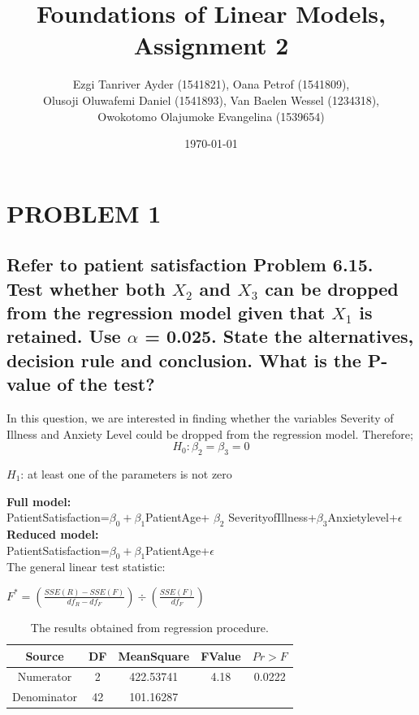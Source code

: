 \documentclass[a4paper,9pt]{article}\usepackage[]{graphicx}\usepackage[]{color}
\title{Foundations of Linear Models, Assignment 2}
\author{ Ezgi Tanriver Ayder (1541821), Oana Petrof (1541809), \\Olusoji Oluwafemi Daniel (1541893), Van Baelen Wessel (1234318), \\Owokotomo Olajumoke Evangelina (1539654)}
\date{\today}
\begin{document}
\maketitle
\section*{PROBLEM 1}
\subsection*{Refer to patient satisfaction Problem 6.15. Test whether both $X_2$ and $X_3$ can be dropped from the regression model given that $X_1$ is retained. Use $\alpha$ = 0.025. State the alternatives, decision rule and conclusion. What is the P-value of the test?}

In this question, we are interested in finding whether the variables Severity of Illness and Anxiety Level could be dropped from the regression model. Therefore;\\
$$H_0:\beta_2 = \beta_3=0$$ 
\begin{center}
$H_1$: at least one of the parameters is not zero\\
\end{center} 

\textbf{Full model:}\\

PatientSatisfaction=$\beta_0+\beta_1$PatientAge+ $\beta_2$ SeverityofIllness+$\beta_3$Anxietylevel+$\epsilon$ \\

\textbf{Reduced model:}\\

PatientSatisfaction=$\beta_0+\beta_1$PatientAge+$\epsilon$ \\

The general linear test statistic:
\begin{center}
$F^*=(\frac{SSE(R)-SSE(F)}{df_R-df_F})\div(\frac{SSE(F)}{df_F})$
\end{center}

\begin {table}[H]
\begin{center}
\caption {The results obtained from regression procedure.} 
\begin{tabular}{ccccc}\hline
 Source & DF & MeanSquare & FValue  & $Pr>F$  \\ \hline
 Numerator & 2  & 422.53741  & 4.18	 & 0.0222 \\ 
 Denominator & 42 & 101.16287  &         &        \\ \hline
\end{tabular}
\end{center}
\end{table}
\end{document}
